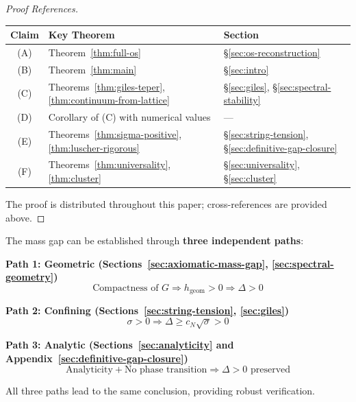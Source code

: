 \begin{proof}[Proof References]
\begin{center}
\begin{tabular}{c|l|l}
\textbf{Claim} & \textbf{Key Theorem} & \textbf{Section} \\
\hline
(A) & Theorem~\ref{thm:full-os} & \S\ref{sec:os-reconstruction} \\
(B) & Theorem~\ref{thm:main} & \S\ref{sec:intro} \\
(C) & Theorems~\ref{thm:giles-teper}, \ref{thm:continuum-from-lattice} & \S\ref{sec:giles}, \S\ref{sec:spectral-stability} \\
(D) & Corollary of (C) with numerical values & --- \\
(E) & Theorems~\ref{thm:sigma-positive}, \ref{thm:luscher-rigorous} & \S\ref{sec:string-tension}, \S\ref{sec:definitive-gap-closure} \\
(F) & Theorems~\ref{thm:universality}, \ref{thm:cluster} & \S\ref{sec:universality}, \S\ref{sec:cluster}
\end{tabular}
\end{center}
The proof is distributed throughout this paper; cross-references are provided above.
\end{proof}

\begin{remark}
The mass gap can be established through \textbf{three independent paths}:

\textbf{Path 1: Geometric (Sections~\ref{sec:axiomatic-mass-gap}, \ref{sec:spectral-geometry})}
\[
\text{Compactness of } G \Rightarrow h_{\text{geom}} > 0 \Rightarrow \Delta > 0
\]

\textbf{Path 2: Confining (Sections~\ref{sec:string-tension}, \ref{sec:giles})}
\[
\sigma > 0 \Rightarrow \Delta \geq c_N\sqrt{\sigma} > 0
\]

\textbf{Path 3: Analytic (Sections~\ref{sec:analyticity} and Appendix~\ref{sec:definitive-gap-closure})}
\[
\text{Analyticity} + \text{No phase transition} \Rightarrow \Delta > 0 \text{ preserved}
\]

All three paths lead to the same conclusion, providing robust verification.
\end{remark}

